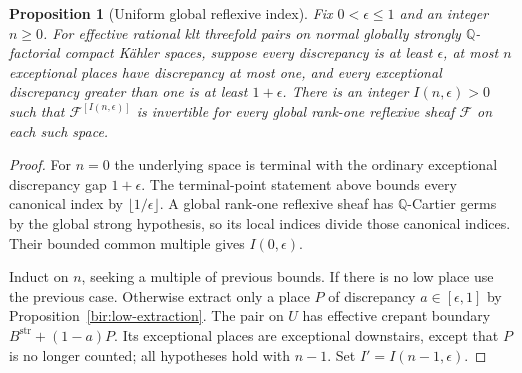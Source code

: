 \documentclass[11pt,letterpaper]{article}
\newtheorem{proposition}[theorem]{Proposition}
\theoremstyle{definition}
\theoremstyle{remark}
\begin{document}
\begin{proposition}[Uniform global reflexive index]
\label{bir:index}
Fix $0<\epsilon\leq1$ and an integer $n\geq0$.  For effective
rational klt threefold pairs on normal globally strongly
$\mathbb{Q}$-factorial compact K\"ahler spaces, suppose every discrepancy is
at least $\epsilon$, at most $n$ exceptional places have discrepancy
at most one, and every exceptional discrepancy greater than one is
at least $1+\epsilon$.  There is an integer $I(n,\epsilon)>0$ such
that $\mathcal F^{[I(n,\epsilon)]}$ is invertible for every global
rank-one reflexive sheaf $\mathcal F$ on each such space.
\end{proposition}

\begin{proof}
For $n=0$ the underlying space is terminal with the ordinary
exceptional discrepancy gap $1+\epsilon$.  The terminal-point
statement above bounds every canonical index by
$\lfloor1/\epsilon\rfloor$.  A global rank-one reflexive sheaf has
$\mathbb{Q}$-Cartier germs by the global strong hypothesis, so its local
indices divide those canonical indices.  Their bounded common
multiple gives $I(0,\epsilon)$.

Induct on $n$, seeking a multiple of previous bounds.  If there is no
low place use the previous case.  Otherwise extract only a place
$P$ of discrepancy $a\in[\epsilon,1]$ by
Proposition~\ref{bir:low-extraction}.  The pair on $U$ has effective
crepant boundary $B^{\mathrm{str}}+(1-a)P$.  Its exceptional places
are exceptional downstairs, except that $P$ is no longer counted;
all hypotheses hold with $n-1$.  Set $I'=I(n-1,\epsilon)$.


\end{proof}
\end{document}
